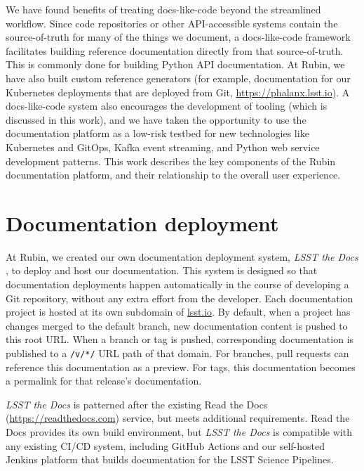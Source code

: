 \documentclass[11pt,twoside]{article}
\begin{document}
We have found benefits of treating docs-like-code beyond the streamlined workflow.
Since code repositories or other API-accessible systems contain the source-of-truth for many of the things we document, a docs-like-code framework facilitates building reference documentation directly from that source-of-truth.
This is commonly done for building Python API documentation.
At Rubin, we have also built custom reference generators (for example, documentation for our Kubernetes deployments that are deployed from Git, \url{https://phalanx.lsst.io}).
A docs-like-code system also encourages the development of tooling (which is discussed in this work), and we have taken the opportunity to use the documentation platform as a low-risk testbed for new technologies like Kubernetes and GitOps, Kafka event streaming, and Python web service development patterns.
This work describes the key components of the Rubin documentation platform, and their relationship to the overall user experience.

\section{Documentation deployment}


At Rubin, we created our own documentation deployment system, \textit{LSST the Docs} \citep{SQR-006}, to deploy and host our documentation.
This system is designed so that documentation deployments happen automatically in the course of developing a Git repository, without any extra effort from the developer.
Each documentation project is hosted at its own subdomain of \href{https://www.lsst.io}{lsst.io}.
By default, when a project has changes merged to the default branch, new documentation content is pushed to this root URL.
When a branch or tag is pushed, corresponding documentation is published to a \texttt{/v/*/} URL path of that domain.
For branches, pull requests can reference this documentation as a preview.
For tags, this documentation becomes a permalink for that release's documentation.

\textit{LSST the Docs} is patterned after the existing Read the Docs (\url{https://readthedocs.com}) service, but meets additional requirements.
Read the Docs provides its own build environment, but \textit{LSST the Docs} is compatible with any existing CI/CD system, including GitHub Actions and our self-hosted Jenkins platform that builds documentation for the LSST Science Pipelines.
\end{document}

